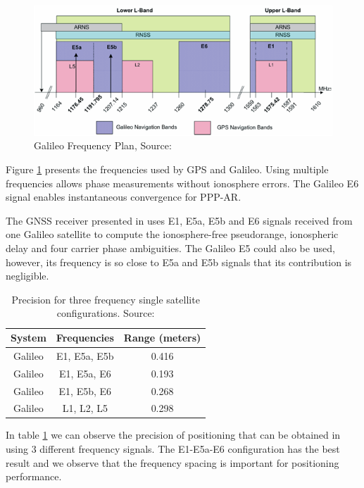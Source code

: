 \begin{figure}[h]
\centering
\includegraphics{img/GalileoFrequencyPlan.png}
\caption{Galileo Frequency Plan, Source:\cite{galileoSisIcd}}
\label{fig:galileofrequencyplan}
\end{figure}

Figure \ref{fig:galileofrequencyplan} presents the frequencies used by GPS and Galileo. Using multiple frequencies allows phase measurements without ionosphere errors\cite{instantPPP}. The Galileo E6 signal enables instantaneous convergence for PPP-AR\cite{instantPPP}.

The GNSS receiver presented in \cite{instantPPP} uses E1, E5a, E5b and E6 signals received from one Galileo satellite to compute the ionosphere-free pseudorange, ionospheric delay and four carrier phase ambiguities\cite{instantPPP}. The Galileo E5 could also be used, however, its frequency is so close to E5a and E5b signals that its contribution is negligible\cite{instantPPP}.

\begin{table}[h!]
\centering
\begin{tabular}{|c|c|c|}
    \hline
    System & Frequencies & Range (meters) \\
    \hline
    Galileo & E1, E5a, E5b & 0.416 \\
    \hline
    Galileo & E1, E5a, E6 & 0.193 \\
    \hline
    Galileo & E1, E5b, E6 & 0.268 \\
    \hline
    Galileo & L1, L2, L5 & 0.298 \\
    \hline
\end{tabular}
\caption{Precision for three frequency single satellite configurations. Source: \cite{instantPPP}}
\label{table:20}
\end{table}

In table \ref{table:20} we can observe the precision of positioning that can be obtained in \cite{instantPPP} using 3 different frequency signals. The E1-E5a-E6 configuration has the best result and we observe that the frequency spacing is important for positioning performance.